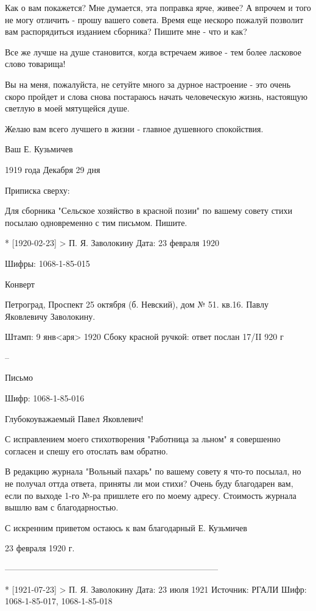 \documentclass[]{memoir}
\begin{document}
Как о вам покажется? Мне думается, эта поправка ярче, живее? А впрочем и того не могу отличить - прошу вашего совета. Время еще нескоро пожалуй позволит вам распорядиться изданием сборника? Пишите мне - что и как?

Все же лучше на душе становится, когда встречаем живое - тем более ласковое слово товарища!

Вы на меня, пожалуйста, не сетуйте много за дурное настроение - это очень скоро пройдет и слова снова постараюсь начать человеческую жизнь, настоящую светлую в моей мятущейся душе.

Желаю вам всего лучшего в жизни - главное душевного спокойствия.

Ваш Е. Кузьмичев

1919 года Декабря 29 дня

Приписка сверху:

Для сборника "Сельское хозяйство в красной позии" по вашему совету стихи посылаю одновременно с тим письмом. Пишите.






* [1920-02-23] > П. Я. Заволокину 
Дата: 23 февраля 1920

Шифры:  1068-1-85-015

Конверт

Петроград, Проспект 25 октября (б. Невский), дом № 51. кв.16. Павлу Яковлевичу Заволокину.

Штамп: 9 янв<аря> 1920
Сбоку красной ручкой: ответ послан 17/II 920 г

--

Письмо

Шифр: 1068-1-85-016

Глубокоуважаемый Павел Яковлевич!

С исправлением моего стихотворения "Работница за льном" я совершенно согласен и спешу его отослать вам обратно.

В редакцию журнала "Вольный пахарь" по вашему совету я что-то посылал, но не получал оттда ответа, приняты ли мои стихи? Очень буду благодарен вам, если по выходе 1-го №-ра пришлете его по моему адресу. Стоимость журнала вышлю вам с благодарностью.

С искренним приветом остаюсь к вам благодарный Е. Кузьмичев

23 февраля 1920 г.

---------------------------------------------------------------------------

* [1921-07-23] > П. Я. Заволокину 
Дата: 23 июля 1921
Источник: РГАЛИ
Шифр: 1068-1-85-017, 1068-1-85-018
\end{document}
